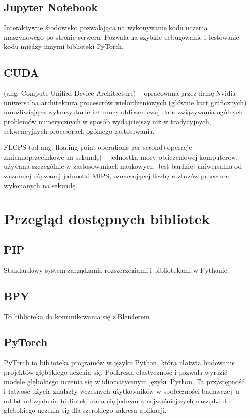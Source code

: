 \documentclass[brudnopis]{xmgr}
\begin{document}
 \section{Jupyter Notebook\label{s:dsssl}}
 
 Interaktywne środowisko pozwalająca na wykonywanie kodu uczenia maszynowego po stronie serwera. Pozwala na szybkie debugowanie i testowanie kodu między innymi biblioteki PyTorch.

 \section{CUDA\label{s:dsssl}}
 
 (ang. Compute Unified Device Architecture) – opracowana przez firmę Nvidia uniwersalna architektura procesorów wielordzeniowych (głównie kart graficznych) umożliwiająca wykorzystanie ich mocy obliczeniowej do rozwiązywania ogólnych problemów numerycznych w sposób wydajniejszy niż w tradycyjnych, sekwencyjnych procesorach ogólnego zastosowania.


FLOPS (od ang. floating point operations per second)  operacje zmiennoprzecinkowe na sekundę) – jednostka mocy obliczeniowej komputerów, używana szczególnie w zastosowaniach naukowych. Jest bardziej uniwersalna od wcześniej używanej jednostki MIPS, oznaczającej liczbę rozkazów procesora wykonanych na sekundę.


\chapter{Przegląd dostępnych bibliotek}


 \section{PIP\label{s:dsssl}}
 Standardowy system zarządzania rozszerzeniami i bibliotekami w Pythonie.
 
  \section{BPY\label{s:dsssl}}
  
  To biblioteka do komunikowania się z Blenderem.
  
    \section{PyTorch\label{s:dsssl}}
    
    
PyTorch to biblioteka programów w języku Python, która ułatwia budowanie projektów głębokiego uczenia się. Podkreśla elastyczność i pozwala wyrazić modele głębokiego uczenia się w idiomatycznym języku Python. Ta przystępność i łatwość użycia znalazły wczesnych użytkowników w społeczności badawczej, a od lat od wydania biblioteki stała się jednym z najważniejszych narzędzi do głębokiego uczenia się dla szerokiego zakresu aplikacji.
\end{document}
